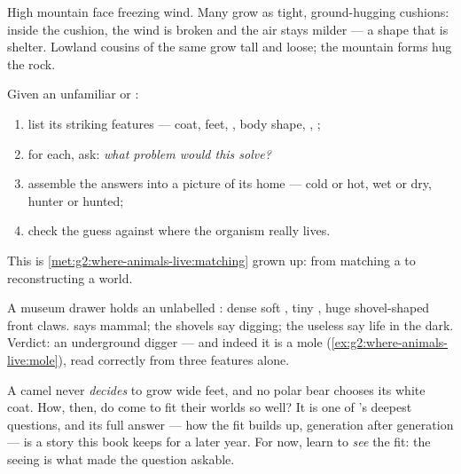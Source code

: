 \begin{example}\label{ex:g4:adapted-to-their-world:alpine}
High mountain  face freezing wind. Many grow as tight,
ground-hugging cushions: inside the cushion, the wind is
broken and the air stays milder — a shape that is shelter.
Lowland cousins of the same  grow tall and loose; the
mountain forms hug the rock.
\end{example}

\begin{method}\label{met:g4:adapted-to-their-world:read}
Given an unfamiliar  or :
\begin{enumerate}
  \item list its striking features --- coat, feet, , body
        shape, , ;
  \item for each, ask: \emph{what problem would this solve?}
  \item assemble the answers into a picture of its home ---
        cold or hot, wet or dry, hunter or hunted;
  \item check the guess against where the organism really
        lives.
\end{enumerate}
This is \cref{met:g2:where-animals-live:matching} grown up:
from matching a  to reconstructing a world.
\end{method}

\begin{example}\label{ex:g4:adapted-to-their-world:mystery}
A museum drawer holds an unlabelled : dense soft ,
tiny , huge shovel-shaped front claws.  says mammal;
the shovels say digging; the useless  say life in the
dark. Verdict: an underground digger --- and indeed it is a
mole (\cref{ex:g2:where-animals-live:mole}), read correctly
from three features alone.
\end{example}

\begin{remark}\label{rem:g4:adapted-to-their-world:how}
A camel never \emph{decides} to grow wide feet, and no polar
bear chooses its white coat. How, then, do  come
to fit their worlds so well? It is one of 's deepest
questions, and its full answer --- how the fit builds up,
generation after generation --- is a story this book keeps
for a later year. For now, learn to \emph{see} the fit: the
seeing is what made the question askable.
\end{remark}

